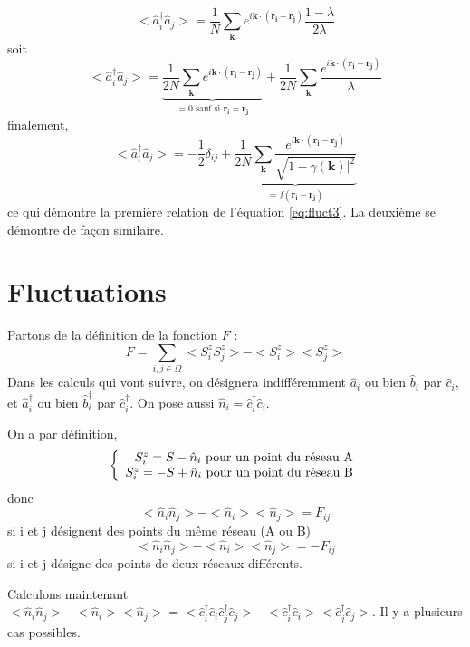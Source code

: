 \documentclass[a4paper, french]{report}
\newcommand{\an}{\hat{a}}
\newcommand{\cre}{\hat{a}^\dagger}
\newcommand{\ban}{\hat{b}}
\newcommand{\bcre}{\hat{b}^\dagger}
\newcommand{\pos}[1]{\ensuremath{\mathbf{r_{#1}}}\xspace}
\newcommand{\ond}{\ensuremath{\mathbf{k}\xspace}}
\newcommand{\gam}{\gamma(\ond{})}
\newcommand{\om}{\ensuremath{\Omega}\xspace}
\newcommand{\1}{\ensuremath{\ket{\om_1\bom_1}}\xspace}
\newcommand{\2}{\ensuremath{\ket{\om_2\bom_2}}\xspace}
\newcommand{\can}{\hat{c}}
\newcommand{\ccre}{\hat{c}^\dagger}
\newcommand{\ene}{\hat n}
\begin{document}
\begin{equation}
	<\cre_i\an_j>=\frac{1}{N}\sum_{\ond}e^{i\ond\cdot(\pos i-\pos j)}\frac{1-\lambda}{2\lambda}
\end{equation}
soit
\begin{equation}
	<\cre_i\an_j>=\underbrace{\frac{1}{2N}\sum_{\ond}e^{i\ond\cdot(\pos i-\pos j)}}_{=0 \text{ sauf si } \pos i = \pos j}+\frac{1}{2N}\sum_{\ond}\frac{e^{i\ond\cdot(\pos i-\pos j)}}{\lambda}
\end{equation}
finalement,
\begin{equation}
	<\cre_i\an_j>=-\frac{1}{2}\delta_{ij}+\underbrace{\frac{1}{2N}\sum_{\ond}\frac{e^{i\ond\cdot(\pos i-\pos j)}}{\sqrt{1-\gam|^2}}}_{=f(\pos i - \pos j)}
\end{equation}
ce qui démontre la première relation de l'équation \ref{eq:fluct3}. La deuxième se démontre de façon similaire.

\section{Fluctuations}
Partons de la définition de la fonction $F$ : 
\begin{equation}
	F=\sum_{i,j \in \om} <S_i^zS_j^z>-<S_i^z><S_j^z>
\end{equation}
Dans les calculs qui vont suivre, on désignera indifféremment $\an_i$ ou bien $\ban_i$ par $\can_i$, et $\cre_i$ ou bien $\bcre_i$ par $\ccre_i$. On pose aussi $\ene_i = \ccre_i\can_i$.

On a par définition,
\begin{equation}
\left\{
	\begin{array}{r c l}
		S_i^z=S-\ene_i \text{ pour un point du réseau A}\\
		S_i^z=-S+\ene_i \text{ pour un point du réseau B}
	\end{array}
\right.
\end{equation}
donc
\begin{equation}
\label{eq:res1}
	<\ene_i\ene_j>-<\ene_i><\ene_j>=F_{ij}
\end{equation}
si i et j désignent des points du même réseau (A ou B)
\begin{equation}
\label{eq:res2}
	<\ene_i\ene_j>-<\ene_i><\ene_j>=-F_{ij}
\end{equation}
si i et j désigne des points de deux réseaux différents.

Calculons maintenant $<\ene_i\ene_j>-<\ene_i><\ene_j>=<\ccre_i\can_i\ccre_j\can_j>-<\ccre_i\can_i><\ccre_j\can_j>$. Il y a plusieurs cas possibles.
\end{document}
